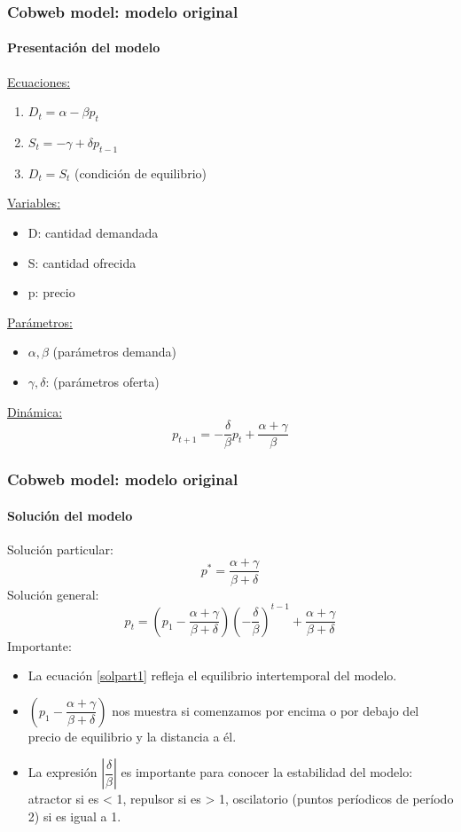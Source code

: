 \documentclass[11pt]{beamer}
\begin{document}
\begin{frame}
\frametitle{Cobweb model: modelo original}
\framesubtitle{Presentación del modelo}
\begin{multicols}{2}
\underline{Ecuaciones:}
\begin{enumerate}
	\item $D_t=\alpha-\beta p_t$
	\item $S_t=-\gamma+\delta p_{t-1}$
	\item $D_t=S_t$ (condición de equilibrio)
\end{enumerate}
\underline{Variables:}
\begin{itemize}
	\item D: cantidad demandada
	\item S: cantidad ofrecida
	\item p: precio
\end{itemize}
\vspace{1cm}
\underline{Parámetros: }
\begin{itemize}
	\item $\alpha, \beta$ (parámetros demanda)
	\item $\gamma, \delta$: (parámetros oferta)
\end{itemize}
\underline{Dinámica:}
\begin{equation}
p_{t+1}=-\dfrac{\delta}{\beta}p_t+\dfrac{\alpha+\gamma}{\beta}
\end{equation}	
\end{multicols}
\end{frame}

\begin{frame}
\frametitle{Cobweb model: modelo original}
\framesubtitle{Solución del modelo}	
Solución particular:
\begin{equation}\label{solpart1}
p^{*}=\dfrac{\alpha+\gamma}{\beta+\delta}
\end{equation}
Solución general:
\begin{equation}
p_t=\left( p_1-\dfrac{\alpha+\gamma}{\beta+\delta}\right) \left(-\dfrac{\delta}{\beta} \right)^{t-1}+
\dfrac{\alpha+\gamma}{\beta+\delta} 
\end{equation}
Importante:
\begin{itemize}
\scriptsize	\item La ecuación \ref{solpart1} refleja el equilibrio intertemporal del modelo.
	\item $\left( p_1-\dfrac{\alpha+\gamma}{\beta+\delta}\right)$ nos muestra si comenzamos por encima o por debajo del precio de equilibrio y la distancia a él.
	\item La expresión $\left|\dfrac{\delta}{\beta} \right|$ es importante para conocer la estabilidad del modelo: atractor si es < 1, repulsor si es > 1, oscilatorio (puntos períodicos de período 2) si es igual a 1.
\end{itemize}
\end{frame}
\end{document}
